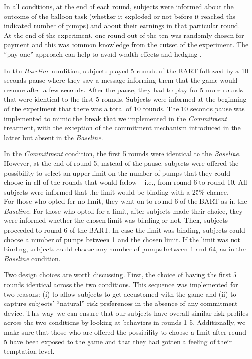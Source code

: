 \documentclass[
]{book}
\begin{document}
In all conditions, at the end of each round, subjects were informed about the
outcome of the balloon task (whether it exploded or not before it reached the
indicated number of pumps) and about their earnings in that particular round.
At the end of the experiment, one round out of the ten was randomly chosen for
payment and this was common knowledge from the outset of the experiment.
The ``pay one'' approach can help to avoid wealth effects and hedging
\citep{charness2016}.

In the \emph{Baseline} condition, subjects played 5 rounds of the BART followed by a 10 seconds
pause where they saw a message informing them that the game would resume after a few seconds.
After the pause, they had to play for 5 more rounds that were identical to the first 5 rounds.
Subjects were informed at the beginning of the experiment that there was a total of 10 rounds.
The 10 seconds pause was implemented to mimic the break that we implemented in the \emph{Commitment} treatment, with the exception of the commitment mechanism introduced in the latter but absent in the \emph{Baseline}.

In the \emph{Commitment} condition, the first 5 rounds were identical to the \emph{Baseline}.
However, at the end of round 5, instead of the pause, subjects were offered the possibility to select an upper limit on the number of pumps that they could choose in all of the rounds that would follow -- i.e., from round 6 to round 10.
All subjects were informed that the limit would be binding with a 25\% chance.\\
For those who opted for no limit, they went on to round 6 of the BART as in the \emph{Baseline}.
For those who opted for a limit, after subjects made their choice, they were informed whether the chosen limit was binding or not.
Then, subjects proceeded to round 6 of the BART.
In case the limit was binding, subjects could choose a number of pumps between 1 and the chosen limit.
If the limit was not binding, subjects could choose any number of pumps between 1 and 64, as in the \emph{Baseline} condition.

Two design choices are worth discussing.
First, the choice of having the first 5 rounds identical across the two conditions.
This sequence was implemented for two reasons:
(i) to allow subjects to get accustomed with the game and
(ii) to capture subjects' ``natural'' risk preferences in the absence of any commitment device.
This way, we can ensure that our subjects have overall similar risk profiles across the two conditions by looking at behaviors in rounds 1-5.
Additionally, we make sure that those who are offered the possibility to choose a limit after round 5 have been exposed to the game and that they had gotten a feeling of their temptation level.
\end{document}
